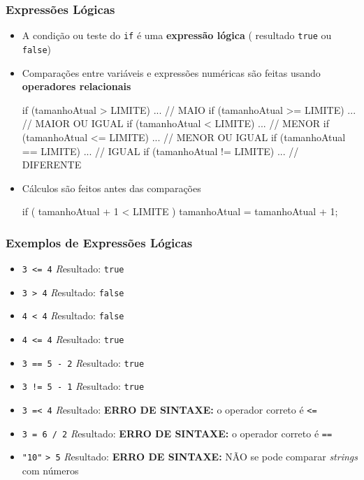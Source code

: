 \documentclass[xcolor={dvipsnames,table},aspectratio=169]{beamer}
\begin{document}
\begin{frame}[fragile]\frametitle{Expressões Lógicas}
\begin{itemize}
	\item A condição ou teste do \texttt{if} é uma \textbf{expressão lógica} (	resultado \texttt{true} ou \texttt{false})
	\item Comparações entre variáveis e expressões numéricas são feitas usando \textbf{operadores relacionais}
\begin{javacode}
if (tamanhoAtual > LIMITE) {...}  // MAIO
if (tamanhoAtual >= LIMITE) {...} // MAIOR OU IGUAL
if (tamanhoAtual < LIMITE) {...}  // MENOR 
if (tamanhoAtual <= LIMITE) {...} // MENOR OU IGUAL
if (tamanhoAtual == LIMITE) {...} // IGUAL
if (tamanhoAtual != LIMITE) {...} // DIFERENTE
\end{javacode}
	\item Cálculos são feitos antes das comparações
\begin{javacode}
if ( tamanhoAtual + 1 < LIMITE )
   tamanhoAtual = tamanhoAtual + 1;
\end{javacode}
\end{itemize}
\end{frame}

\begin{frame}\frametitle{Exemplos de Expressões Lógicas}
\begin{itemize}
	\item \texttt{3 <= 4} \tabto{3cm} {\footnotesize\emph Resultado: \texttt{true}}
	\item \texttt{3 > 4} \tabto{3cm} {\footnotesize\emph Resultado: \texttt{false}}
	\item \texttt{4 < 4} \tabto{3cm} {\footnotesize\emph Resultado: \texttt{false}}
	\item \texttt{4 <= 4} \tabto{3cm} {\footnotesize\emph Resultado: \texttt{true}}
	\item \texttt{3 == 5 - 2} \tabto{3cm} {\footnotesize\emph Resultado: \texttt{true}}
	\item \texttt{3 != 5 - 1} \tabto{3cm} {\footnotesize\emph Resultado: \texttt{true}}
	\item \texttt{3 =< 4} \tabto{3cm} {\footnotesize\emph Resultado: \textbf{ERRO DE SINTAXE:} o operador correto é \texttt{<=}}
	\item \texttt{3 = 6 / 2} \tabto{3cm} {\footnotesize\emph Resultado: \textbf{ERRO DE SINTAXE:} o operador correto é \texttt{==}}
	\item \texttt{"10"} \texttt{> 5} \tabto{3cm} {\footnotesize\emph Resultado: \textbf{ERRO DE SINTAXE:} NÃO se pode comparar \emph{strings} com números}
\end{itemize}
\end{frame}
\end{document}
